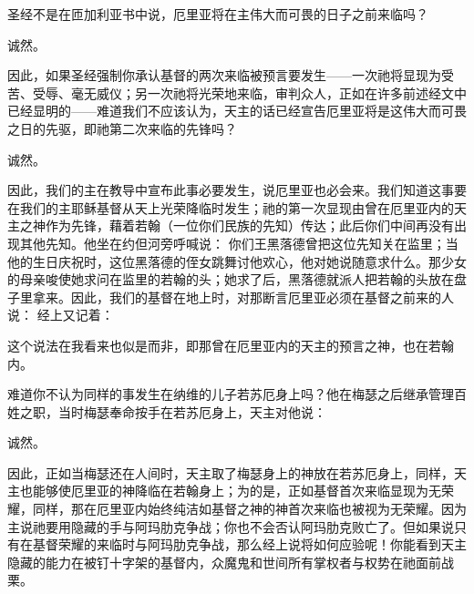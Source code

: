 圣经不是在匝加利亚书中说，厄里亚将在主伟大而可畏的日子之前来临吗？\par

诚然。\par

因此，如果圣经强制你承认基督的两次来临被预言要发生——一次祂将显现为受苦、受辱、毫无威仪；另一次祂将光荣地来临，审判众人，正如在许多前述经文中已经显明的——难道我们不应该认为，天主的话已经宣告厄里亚将是这伟大而可畏之日的先驱，即祂第二次来临的先锋吗？\par

诚然。\par

因此，我们的主在教导中宣布此事必要发生，说厄里亚也必会来。我们知道这事要在我们的主耶稣基督从天上光荣降临时发生；祂的第一次显现由曾在厄里亚内的天主之神作为先锋，藉着若翰（一位你们民族的先知）传达；此后你们中间再没有出现其他先知。他坐在约但河旁呼喊说： 你们王黑落德曾把这位先知关在监里；当他的生日庆祝时，这位黑落德的侄女跳舞讨他欢心，他对她说随意求什么。那少女的母亲唆使她求问在监里的若翰的头；她求了后，黑落德就派人把若翰的头放在盘子里拿来。因此，我们的基督在地上时，对那断言厄里亚必须在基督之前来的人说： 经上又记着：\par

这个说法在我看来也似是而非，即那曾在厄里亚内的天主的预言之神，也在若翰内。\par

难道你不认为同样的事发生在纳维的儿子若苏厄身上吗？他在梅瑟之后继承管理百姓之职，当时梅瑟奉命按手在若苏厄身上，天主对他说：\par

诚然。\par

因此，正如当梅瑟还在人间时，天主取了梅瑟身上的神放在若苏厄身上，同样，天主也能够使厄里亚的神降临在若翰身上；为的是，正如基督首次来临显现为无荣耀，同样，那在厄里亚内始终纯洁如基督之神的神首次来临也被视为无荣耀。因为主说祂要用隐藏的手与阿玛肋克争战；你也不会否认阿玛肋克败亡了。但如果说只有在基督荣耀的来临时与阿玛肋克争战，那么经上说将如何应验呢！你能看到天主隐藏的能力在被钉十字架的基督内，众魔鬼和世间所有掌权者与权势在祂面前战栗。\par

